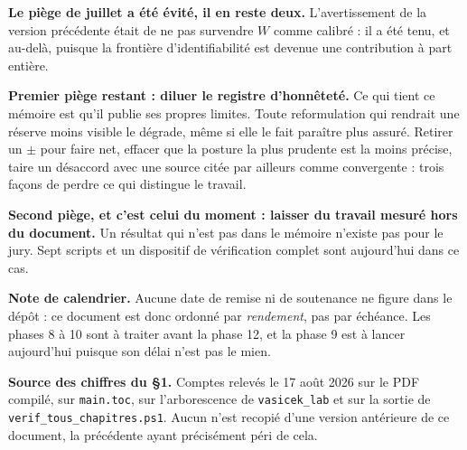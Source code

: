 \documentclass[11pt,a4paper]{article}
\begin{document}
\vspace{0.25cm}
\begin{cle}
\textbf{Le piège de juillet a été évité, il en reste deux.} L'avertissement de la version
précédente était de ne pas survendre $W$ comme calibré : il a été tenu, et au-delà, puisque la
frontière d'identifiabilité est devenue une contribution à part entière.

\textbf{Premier piège restant : diluer le registre d'honnêteté.} Ce qui tient ce mémoire est
qu'il publie ses propres limites. Toute reformulation qui rendrait une réserve moins visible le
dégrade, même si elle le fait paraître plus assuré. Retirer un $\pm$ pour faire net, effacer que
la posture la plus prudente est la moins précise, taire un désaccord avec une source citée par
ailleurs comme convergente : trois façons de perdre ce qui distingue le travail.

\textbf{Second piège, et c'est celui du moment : laisser du travail mesuré hors du document.}
Un résultat qui n'est pas dans le mémoire n'existe pas pour le jury. Sept scripts et un
dispositif de vérification complet sont aujourd'hui dans ce cas.
\end{cle}

\vspace{0.2cm}
\noindent\footnotesize\textbf{Note de calendrier.} Aucune date de remise ni de soutenance ne
figure dans le dépôt : ce document est donc ordonné par \emph{rendement}, pas par échéance. Les
phases 8 à 10 sont à traiter avant la phase 12, et la phase 9 est à lancer aujourd'hui puisque
son délai n'est pas le mien.

\vspace{0.15cm}
\noindent\footnotesize\textbf{Source des chiffres du \S1.} Comptes relevés le 17 août 2026 sur
le PDF compilé, sur \texttt{main.toc}, sur l'arborescence de \texttt{vasicek\_lab} et sur la
sortie de \texttt{verif\_tous\_chapitres.ps1}. Aucun n'est recopié d'une version antérieure de
ce document, la précédente ayant précisément péri de cela.
\end{document}
